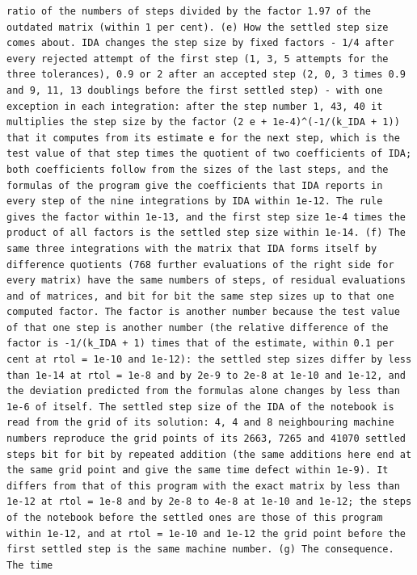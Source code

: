 \documentclass[
  10pt,
]{article}
\begin{document}
\begin{verbatim}
ratio of the numbers of steps divided by the factor 1.97 of the outdated matrix (within 1 per cent). (e) How the settled step size comes about. IDA changes the step size by fixed factors - 1/4 after every rejected attempt of the first step (1, 3, 5 attempts for the three tolerances), 0.9 or 2 after an accepted step (2, 0, 3 times 0.9 and 9, 11, 13 doublings before the first settled step) - with one exception in each integration: after the step number 1, 43, 40 it multiplies the step size by the factor (2 e + 1e-4)^(-1/(k_IDA + 1)) that it computes from its estimate e for the next step, which is the test value of that step times the quotient of two coefficients of IDA; both coefficients follow from the sizes of the last steps, and the formulas of the program give the coefficients that IDA reports in every step of the nine integrations by IDA within 1e-12. The rule gives the factor within 1e-13, and the first step size 1e-4 times the product of all factors is the settled step size within 1e-14. (f) The same three integrations with the matrix that IDA forms itself by difference quotients (768 further evaluations of the right side for every matrix) have the same numbers of steps, of residual evaluations and of matrices, and bit for bit the same step sizes up to that one computed factor. The factor is another number because the test value of that one step is another number (the relative difference of the factor is -1/(k_IDA + 1) times that of the estimate, within 0.1 per cent at rtol = 1e-10 and 1e-12): the settled step sizes differ by less than 1e-14 at rtol = 1e-8 and by 2e-9 to 2e-8 at 1e-10 and 1e-12, and the deviation predicted from the formulas alone changes by less than 1e-6 of itself. The settled step size of the IDA of the notebook is read from the grid of its solution: 4, 4 and 8 neighbouring machine numbers reproduce the grid points of its 2663, 7265 and 41070 settled steps bit for bit by repeated addition (the same additions here end at the same grid point and give the same time defect within 1e-9). It differs from that of this program with the exact matrix by less than 1e-12 at rtol = 1e-8 and by 2e-8 to 4e-8 at 1e-10 and 1e-12; the steps of the notebook before the settled ones are those of this program within 1e-12, and at rtol = 1e-10 and 1e-12 the grid point before the first settled step is the same machine number. (g) The consequence. The time

\end{verbatim}
\end{document}
